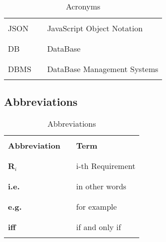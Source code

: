 \begin{table}[H]
\begin{tabular}{l l p{11cm}}
                          &        &                                                        \\\hline \\
        JSON              & \vline & JavaScript Object Notation                             \\
                          &        &                                                        \\\hline \\
        DB                & \vline & DataBase                                               \\
                          &        &                                                        \\\hline \\
        DBMS              & \vline & DataBase Management Systems                            \\
                          &        &                                                        \\
        \hline
    \end{tabular}
    \caption{Acronyms}
\end{table}

\subsection{Abbreviations}
\begin{table}[H]
    \centering
    \renewcommand{\arraystretch}{0.5}
    \begin{tabular}{l l p{10.5cm}}
        \hline
                              &        &                        \\
        \textbf{Abbreviation} & \vline & \textbf{Term}          \\
                              &        &                        \\\hline & & \\
        \textbf{R}\(_i\)      & \vline & i-th Requirement       \\
                              &        &                        \\\hline & & \\
        \textbf{i.e.}         & \vline & in other words         \\
                              &        &                        \\\hline & & \\
        \textbf{e.g.}         & \vline & for example            \\
                              &        &                        \\\hline & & \\
        \textbf{iff}          & \vline & if and only if         \\
                              &        &                        \\
        \hline
    \end{tabular}
    \caption{Abbreviations}
\end{table}

